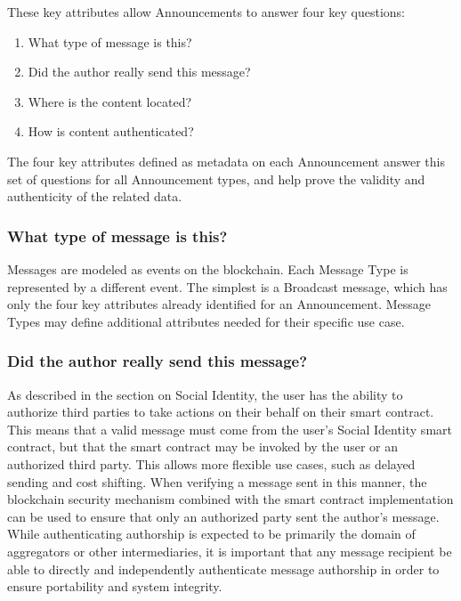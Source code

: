 \documentclass[12pt,letterpaper]{article}
\providecommand{\tightlist}{%
\setlength{\itemsep}{0pt}\setlength{\parskip}{0pt}}
\begin{document}
\begin{samepage}
	These key attributes allow Announcements to answer four key questions:

	\begin{enumerate}
		\tightlist
		\item
		      What type of message is this?
		\item
		      Did the author really send this message?
		\item
		      Where is the content located?
		\item
		      How is content authenticated?
	\end{enumerate}
\end{samepage}

The four key attributes defined as metadata on each Announcement answer this set of
questions for all Announcement types, and help prove the validity and authenticity of the
related data.

\subsubsection{What type of message is this?}

Messages are modeled as events on the blockchain. Each Message Type is represented by a
different event. The simplest is a Broadcast message, which has only the four key
attributes already identified for an Announcement. Message Types may define additional
attributes needed for their specific use case.

\subsubsection{Did the author really send this message?}

As described in the section on Social Identity, the user has the ability to authorize
third parties to take actions on their behalf on their smart contract. This means that a
valid message must come from the user's Social Identity smart contract, but that the smart
contract may be invoked by the user or an authorized third party. This allows more
flexible use cases, such as delayed sending and cost shifting. When verifying a message
sent in this manner, the blockchain security mechanism combined with the smart contract
implementation can be used to ensure that only an authorized party sent the author's
message. While authenticating authorship is expected to be primarily the domain of
aggregators or other intermediaries, it is important that any message recipient be able to
directly and independently authenticate message authorship in order to ensure portability
and system integrity.
\end{document}
